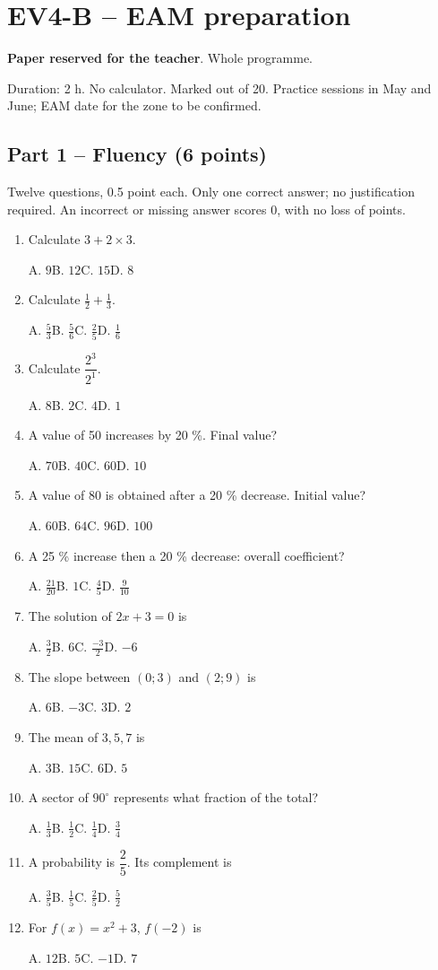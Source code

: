 \clearpage\section*{EV4-B -- EAM preparation}\label{EV4-B}
\textbf{Paper reserved for the teacher}. Whole programme.\par Duration: 2 h. No calculator. Marked out of 20. Practice sessions in May and June; EAM date for the zone to be confirmed.
\subsection*{Part 1 -- Fluency (6 points)}
Twelve questions, 0.5 point each. Only one correct answer; no justification required. An incorrect or missing answer scores 0, with no loss of points.
\begin{enumerate}
\item Calculate $3+2\times3$.\par A. $9$\quad B. $12$\quad C. $15$\quad D. $8$
\item Calculate $\frac12+\frac13$.\par A. $\frac{5}{3}$\quad B. $\frac{5}{6}$\quad C. $\frac{2}{5}$\quad D. $\frac{1}{6}$
\item Calculate $\dfrac{2^3}{2^{1}}$.\par A. $8$\quad B. $2$\quad C. $4$\quad D. $1$
\item A value of 50 increases by 20 \%. Final value?\par A. $70$\quad B. $40$\quad C. $60$\quad D. $10$
\item A value of 80 is obtained after a 20 \% decrease. Initial value?\par A. $60$\quad B. $64$\quad C. $96$\quad D. $100$
\item A 25 \% increase then a 20 \% decrease: overall coefficient?\par A. $\frac{21}{20}$\quad B. $1$\quad C. $\frac{4}{5}$\quad D. $\frac{9}{10}$
\item The solution of $2x+3=0$ is\par A. $\frac{3}{2}$\quad B. $6$\quad C. $\frac{-3}{2}$\quad D. $-6$
\item The slope between $(0;3)$ and $(2;9)$ is\par A. $6$\quad B. $-3$\quad C. $3$\quad D. $2$
\item The mean of $3, 5, 7$ is\par A. $3$\quad B. $15$\quad C. $6$\quad D. $5$
\item A sector of $90^\circ$ represents what fraction of the total?\par A. $\frac{1}{3}$\quad B. $\frac{1}{2}$\quad C. $\frac{1}{4}$\quad D. $\frac{3}{4}$
\item A probability is $\dfrac{2}{5}$. Its complement is\par A. $\frac{3}{5}$\quad B. $\frac{1}{5}$\quad C. $\frac{2}{5}$\quad D. $\frac{5}{2}$
\item For $f(x)=x^2+3$, $f(-2)$ is\par A. $12$\quad B. $5$\quad C. $-1$\quad D. $7$
\end{enumerate}
